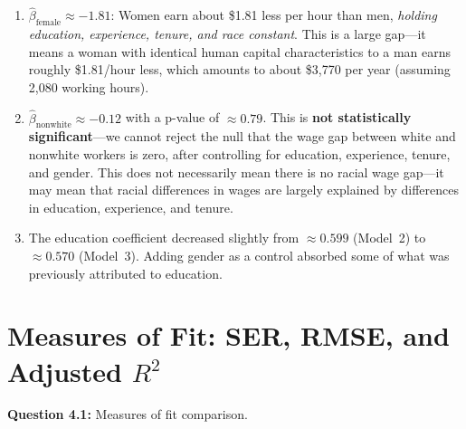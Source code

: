 \documentclass[11pt,letterpaper]{article}
\begin{document}
\begin{answer}
\begin{enumerate}[label=(\alph*)]
\item $\hat{\beta}_{\text{female}} \approx -1.81$: Women earn about \$1.81 less per hour than men, \textit{holding education, experience, tenure, and race constant}. This is a large gap---it means a woman with identical human capital characteristics to a man earns roughly \$1.81/hour less, which amounts to about \$3,770 per year (assuming 2,080 working hours).

\item $\hat{\beta}_{\text{nonwhite}} \approx -0.12$ with a p-value of $\approx 0.79$. This is \textbf{not statistically significant}---we cannot reject the null that the wage gap between white and nonwhite workers is zero, after controlling for education, experience, tenure, and gender. This does not necessarily mean there is no racial wage gap---it may mean that racial differences in wages are largely explained by differences in education, experience, and tenure.

\item The education coefficient decreased slightly from $\approx 0.599$ (Model~2) to $\approx 0.570$ (Model~3). Adding gender as a control absorbed some of what was previously attributed to education.
\end{enumerate}
\end{answer}

\newpage

\section{Measures of Fit: SER, RMSE, and Adjusted $R^2$}

\textbf{Question 4.1:} Measures of fit comparison.
\end{document}
